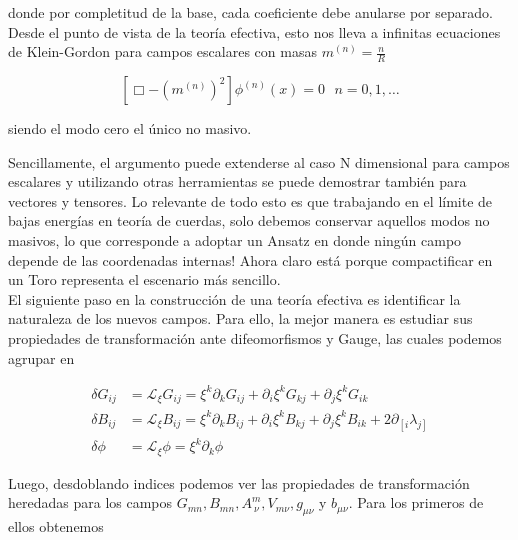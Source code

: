 \documentclass{article}
\numberwithin{equation}{section}
\begin{document}
donde por completitud de la base, cada coeficiente debe anularse por separado. Desde el punto de vista de la teoría efectiva, esto nos lleva a infinitas ecuaciones de Klein-Gordon para campos escalares con masas $ m^{(n)} = \frac{n}{R} $

\begin{equation}
\left[\Box - (m^{(n)})^2 \right] \phi^{(n)}(x) = 0 \ \ \ n=0,1,\dots
\end{equation} 

siendo el modo cero el único no masivo.

Sencillamente, el argumento puede extenderse al caso N dimensional para campos escalares y utilizando otras herramientas se puede demostrar también para vectores y tensores. Lo relevante de todo esto es que trabajando en el límite de bajas energías en teoría de cuerdas, solo debemos conservar aquellos modos no masivos, lo que corresponde a adoptar un Ansatz en donde ningún campo depende de las coordenadas internas! Ahora claro está porque compactificar en un Toro representa el escenario más sencillo.\\


El siguiente paso en la construcción de una teoría efectiva es identificar la naturaleza de los nuevos campos. Para ello, la mejor manera es estudiar sus propiedades de transformación ante difeomorfismos y Gauge, las cuales podemos agrupar en

\begin{subequations}
	\begin{align}
	\label{deltag}
	\delta G_{i j} &= \mathcal{L}_{\xi}G_{i j} = \xi^{k} \partial_k G_{i j} + \partial_i \xi^k G_{k j} + \partial_j \xi^k G_{i k}\\ 
	\label{deltab}
	\delta B_{i j} &= \mathcal{L}_{\xi}B_{i j} = \xi^{k} \partial_k B_{i j} + \partial_i \xi^k B_{k j} + \partial_j \xi^k B_{i k} + 2 \partial_{\left[ i \right.} \lambda_{\left. j \right]}\\
	\label{deltafi} 
	\delta \phi &= \mathcal{L}_{\xi} \phi = \xi^{k} \partial_k \phi
	\end{align}
\end{subequations} 

Luego, desdoblando indices podemos ver las propiedades de transformación heredadas para los campos $ G_{m n}, B_{m n}, A^m_{\ \nu}, V_{m \nu}, g_{\mu \nu} $ y $ b_{\mu \nu} $. Para los primeros de ellos obtenemos
\end{document}
